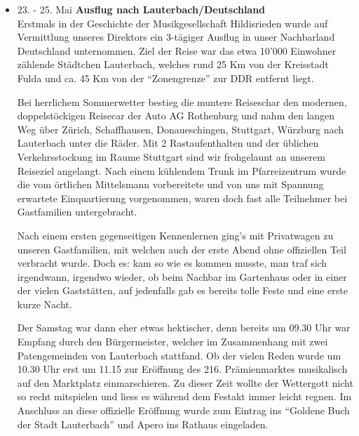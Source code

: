 \begin{history}
\begin{itemize}
        \item 23. - 25. Mai \textbf{Ausflug nach Lauterbach/Deutschland}\\
              Erstmals in der Geschichte der Musikgesellschaft Hildisrieden wurde auf
              Vermittlung unseres Direktors ein 3-tägiger Ausflug in unser Nachbarland
              Deutschland unternommen. Ziel der Reise war das etwa 10'000 Einwohner
              zählende Städtchen Lauterbach, welches rund 25 Km von der Kreisstadt
              Fulda und ca. 45 Km von der \enquote{Zonengrenze} zur DDR entfernt
              liegt.

              Bei herrlichem Sommerwetter bestieg die muntere Reiseschar den modernen,
              doppelstöckigen Reisecar der Auto AG Rothenburg und nahm den langen Weg
              über Zürich, Schaffhausen, Donaueschingen, Stuttgart, Würzburg nach
              Lauterbach unter die Räder. Mit 2 Rastaufenthalten und der üblichen
              Verkehrsstockung im Raume Stuttgart sind wir frohgelaunt an unserem
              Reiseziel angelangt. Nach einem kühlendem Trunk im Pfarreizentrum wurde
              die vom örtlichen Mittelsmann vorbereitete und von uns mit Spannung
              erwartete Einquartierung vorgenommen, waren doch fast alle Teilnehmer
              bei Gastfamilien untergebracht.

              Nach einem ersten gegenseitigen Kennenlernen ging's mit Privatwagen zu
              unseren Gastfamilien, mit welchen auch der erste Abend ohne offiziellen
              Teil verbracht wurde. Doch es: kam so wie es kommen musste, man traf
              sich irgendwann, irgendwo wieder, ob beim Nachbar im Gartenhaus oder in
              einer der vielen Gaststätten, auf jedenfalls gab es bereits tolle Feste
              und eine erste kurze Nacht.

              Der Samstag war dann eher etwas hektischer, denn bereits um 09.30 Uhr
              war Empfang durch den Bürgermeister, welcher im Zusammenhang mit zwei
              Patengemeinden von Lauterbach stattfand. Ob der vielen Reden wurde um
              10.30 Uhr erst um 11.15 zur Eröffnung des 216. Prämienmarktes
              musikalisch auf den Marktplatz einmarschieren. Zu dieser Zeit wollte der
              Wettergott nicht so recht mitspielen und liess es während dem Festakt
              immer leicht regnen. Im Anschluss an diese offizielle Eröffnung wurde
              zum Eintrag ins \enquote{Goldene Buch der Stadt Lauterbach} und Apero
              ins Rathaus eingeladen.


\end{itemize}
\end{history}
